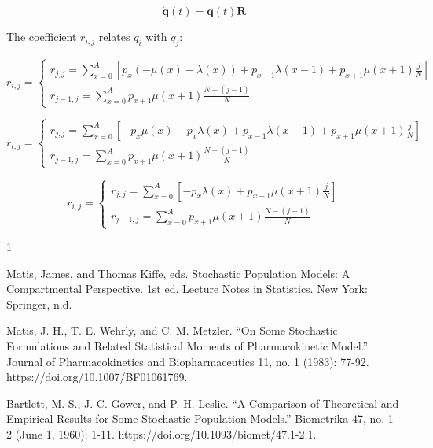 \documentclass{article}
\begin{document}
$$\dot{\mathbf{q}}(t)=\mathbf{q}(t)\mathbf{R}$$

The coefficient $r_{i,j}$ relates $q_i$ with $\dot{q}_j$:


\begin{equation*}
    r_{i,j}=\begin{cases}
        r_{j,j}=\sum_{x=0}^{A}[p_x(-\mu(x)-\lambda(x))+p_{x-1}\lambda(x-1)+p_{x+1}\mu(x+1)\frac{j}{N}]\\
        r_{j-1,j}=\sum_{x=0}^{A}p_{x+1}\mu(x+1)\frac{N-(j-1)}{N}
    \end{cases}
\end{equation*}

\begin{equation*}
    r_{i,j}=\begin{cases}
        r_{j,j}=\sum_{x=0}^{A}[-p_x\mu(x)-p_x\lambda(x)+p_{x-1}\lambda(x-1)+p_{x+1}\mu(x+1)\frac{j}{N}]\\
        r_{j-1,j}=\sum_{x=0}^{A}p_{x+1}\mu(x+1)\frac{N-(j-1)}{N}
    \end{cases}
\end{equation*}

\begin{equation*}
    r_{i,j}=\begin{cases}
        r_{j,j}=\sum_{x=0}^{A}[-p_x\lambda(x)+p_{x+1}\mu(x+1)\frac{j}{N}]\\
        r_{j-1,j}=\sum_{x=0}^{A}p_{x+1}\mu(x+1)\frac{N-(j-1)}{N}
    \end{cases}
\end{equation*}

\begin{thebibliography}{1}

     Matis, James, and Thomas Kiffe, eds. Stochastic Population Models: A Compartmental Perspective. 1st ed. Lecture Notes in Statistics. New York: Springer, n.d.

     Matis, J. H., T. E. Wehrly, and C. M. Metzler. “On Some Stochastic Formulations and Related Statistical Moments of Pharmacokinetic Model.” Journal of Pharmacokinetics and Biopharmaceutics 11, no. 1 (1983): 77-92. https://doi.org/10.1007/BF01061769.

     Bartlett, M. S., J. C. Gower, and P. H. Leslie. “A Comparison of Theoretical and Empirical Results for Some Stochastic Population Models.” Biometrika 47, no. 1-2 (June 1, 1960): 1-11. https://doi.org/10.1093/biomet/47.1-2.1.

\end{thebibliography}
\end{document}
